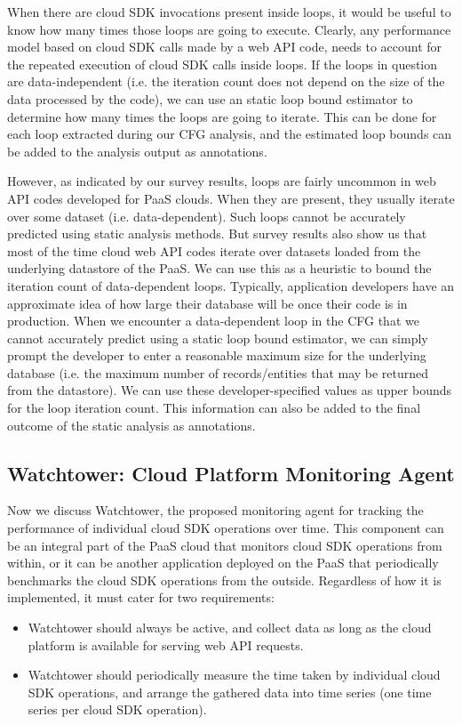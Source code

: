 When there are cloud SDK invocations present inside loops, it would be useful to know how many times those loops
are going to execute. Clearly, any performance model based on cloud SDK calls made by a web API code,
needs to account for the repeated execution of cloud SDK calls inside loops. If the 
loops in question are data-independent (i.e. the iteration count does not depend on the size of the data processed 
by the code), we can use an static loop bound estimator to determine how many times the loops are going to iterate.
This can be done for each loop extracted during our CFG analysis, and the estimated loop bounds can be added to the
analysis output as annotations.

However, as indicated by our survey results, loops are fairly uncommon in web API codes developed for PaaS clouds. When
they are present, they usually iterate over some dataset (i.e. data-dependent). Such loops cannot
be accurately predicted using static analysis methods. But survey results also show us that
most of the time cloud web API codes iterate over datasets loaded from the underlying datastore of the PaaS.
We can use this as a heuristic to bound the iteration count of data-dependent loops. Typically, application developers
have an approximate idea of how large their database will be once their code is in production. When we encounter a data-dependent
loop in the CFG that we cannot accurately predict using a static loop bound estimator, we can simply
prompt the developer to enter a reasonable maximum size for the underlying database (i.e. the maximum number of
records/entities that may be returned from the datastore). We can
use these developer-specified values as upper bounds for the loop iteration count. 
This information can also be added to the final outcome of the static analysis as annotations.

\subsection{Watchtower: Cloud Platform Monitoring Agent}
Now we discuss Watchtower, the proposed monitoring agent for tracking the performance of individual
cloud SDK operations over time. This component can be an integral part of the PaaS cloud that
monitors cloud SDK operations from within, or it can be another application deployed on the PaaS
that periodically benchmarks the cloud SDK operations from the outside. Regardless of how it is
implemented, it must cater for two requirements:

\begin{itemize}
\item Watchtower should always be active, and collect data as long as the cloud platform is available for serving web API requests.
\item Watchtower should periodically measure the time taken by individual cloud SDK operations, and arrange the gathered data into time series (one time series per cloud SDK operation).
\end{itemize}

